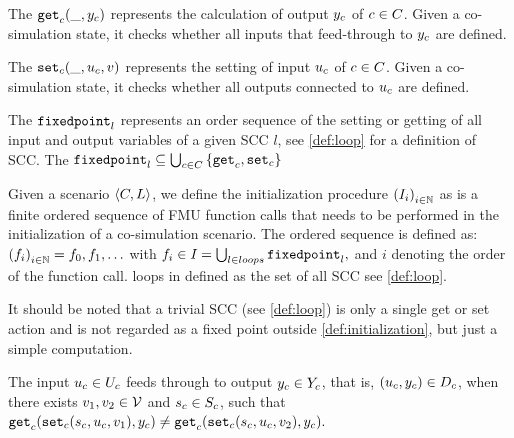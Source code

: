 \begin{definition}\label{def:getout}
The $\mathtt{get}_{c}(\_, y_{c})$ represents the calculation of output $y_{c}$ of $c \in C$. Given a co-simulation state, it checks whether all inputs that feed-through to $y_{c}$ are defined.
\end{definition}

\begin{definition}\label{def:setin}
The $\mathtt{set}_{c}(\_, u_{c}, v)$ represents the setting of input $u_{c}$  of $c \in C$. Given a co-simulation state, it checks whether all outputs connected to $u_{c}$ are defined.
\end{definition}

\begin{definition}\label{def:fixedpoint}
The $\mathtt{fixedpoint}_{l}$ represents an order sequence of the setting or getting of all input and output variables of a given SCC $l$, see \cref{def:loop} for a definition of SCC.
The $\mathtt{fixedpoint}_{l} \subseteq \bigcup_{c \in C}  \left\{ \mathtt{get}_{c},\mathtt{set}_{c} \right\}$ 
\end{definition}


\begin{definition}[Initialization]\label{def:initialization}
  Given a scenario $ \left\langle C, L \right\rangle $, we define the initialization procedure $ \left( I_i \right)_{i \in \mathbb{N}}$ as is a finite ordered sequence of FMU function calls that needs to be performed in the initialization of a co-simulation scenario. The ordered sequence is defined as: $ \left( f_i \right)_{i \in \mathbb{N}} = f_0, f_1, \ldots$ with
  $f_i \in I_{} = \bigcup_{l \in loops} \mathtt{fixedpoint}_{l},$
  and $i$ denoting the order of the function call.
  loops in defined as the set of all SCC see \cref{def:loop}.
\end{definition}

It should be noted that a trivial SCC (see \cref{def:loop}) is only a single get or set action and is not regarded as a fixed point outside \cref{def:initialization}, but just a simple computation.


\begin{definition}\label{def:feedthrough}
  The input $u_{c} \in U_{c}$ feeds through to output $y_{c} \in Y_{c}$, that is, $(u_{c},y_{c}) \in D_{c}$, when there exists $v_1, v_2 \in \mathcal{V}$ and $s_{c} \in S_{c}$, such that
  $
  \mathtt{get}_{c} (\mathtt{set}_{c}(s_{c}, u_{c}, v_1), y_{c}) \neq \mathtt{get}_{c} (\mathtt{set}_{c}(s_{c}, u_{c}, v_2), y_{c}).
  $
\end{definition}

